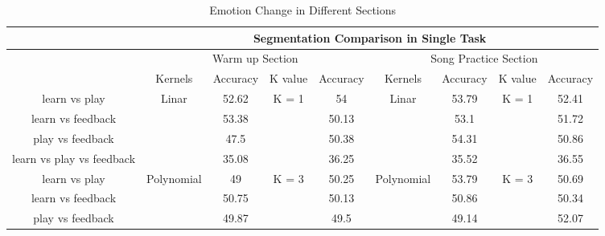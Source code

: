 \documentclass[conference]{IEEEtran}
\begin{document}
\begin{table*}[tbp]
	\caption{Emotion Change in Different Sections}
	\begin{center}
	\begin{tabular}{ccccccccc}
		\multicolumn{1}{l}{\multirow{3}{*}{}} & \multicolumn{8}{c}{Segmentation Comparison in Single Task}                                                                                                       \\
		\hline
		\multicolumn{1}{l}{}                  & \multicolumn{4}{c}{Warm up Section}                                                   & \multicolumn{4}{c}{Song Practice Section}                                                  \\
		\hline
		\multicolumn{1}{l}{}                  & Kernels                     & Accuracy & K value                & Accuracy & Kernels                     & Accuracy & K value                & Accuracy \\
		learn vs play                                   & \multirow{4}{*}{Linar}      & 52.62    & \multirow{4}{*}{K = 1} & 54       & \multirow{4}{*}{Linar}      & 53.79    & \multirow{4}{*}{K = 1} & 52.41    \\
		learn vs feedback                                   &                             & 53.38    &                        & 50.13    &                             & 53.1     &                        & 51.72    \\
		play vs feedback                                   &                             & 47.5     &                        & 50.38    &                             & 54.31    &                        & 50.86    \\
		learn vs play vs feedback                                 &                             & 35.08    &                        & 36.25    &                             & 35.52    &                        & 36.55    \\
		\hline
		learn vs play                                   & \multirow{4}{*}{Polynomial} & 49       & \multirow{4}{*}{K = 3} & 50.25    & \multirow{4}{*}{Polynomial} & 53.79    & \multirow{4}{*}{K = 3} & 50.69    \\
		learn vs feedback                                 &                             & 50.75    &                        & 50.13    &                             & 50.86    &                        & 50.34    \\
		play vs feedback                                   &                             & 49.87    &                        & 49.5     &                             & 49.14    &                        & 52.07    \\

\end{tabular}
\end{center}
\end{table*}
\end{document}

